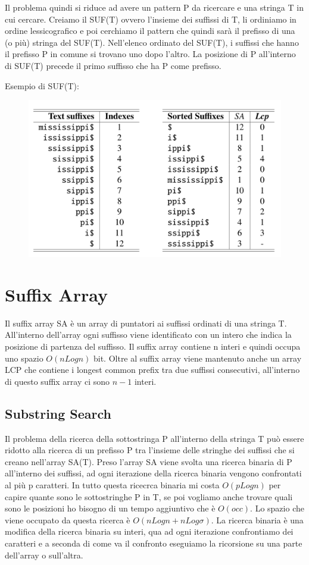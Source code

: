 \documentclass[14pt]{extreport}
\begin{document}
Il problema quindi si riduce ad avere un pattern P da ricercare e una stringa T in cui cercare. Creiamo il SUF(T) ovvero l'insieme dei suffissi di T, li ordiniamo in ordine lessicografico e poi cerchiamo il pattern che quindi sarà il prefisso di una (o più) stringa del SUF(T).
Nell'elenco ordinato del SUF(T), i suffissi che hanno il prefisso P in comune si trovano uno dopo l'altro.
La posizione di P all'interno di SUF(T) precede il primo suffisso che ha P come prefisso.

Esempio di SUF(T):

\begin{figure}[!h]
\centering
  \includegraphics[width=0.7\linewidth]{SUFT.png}
\end{figure}

\section{Suffix Array}

Il suffix array SA è un array di puntatori ai suffissi ordinati di una stringa T. All'interno dell'array ogni suffisso viene identificato con un intero che indica la posizione di partenza del suffisso.
Il suffix array contiene n interi e quindi occupa uno spazio $O(nLogn)$ bit. 
Oltre al suffix array viene mantenuto anche un array LCP che contiene i longest common prefix tra due suffissi consecutivi, all'interno di questo suffix array ci sono $n-1$ interi.

\subsection{Substring Search}

Il problema della ricerca della sottostringa P all'interno della stringa T può essere ridotto alla ricerca di un prefisso P tra l'insieme delle stringhe dei suffissi che si creano nell'array SA(T).
Preso l'array SA viene svolta una ricerca binaria di P all'interno dei suffissi, ad ogni iterazione della ricerca binaria vengono confrontati al più p caratteri. In tutto questa ricecrca binaria mi costa $O(pLogn)$ per capire quante sono le sottostringhe P in T, se poi vogliamo anche trovare quali sono le posizioni ho bisogno di un tempo aggiuntivo che è $O(occ)$. Lo spazio che viene occupato da questa ricerca è $O(nLogn + nLog\sigma)$.
La ricerca binaria è una modifica della ricerca binaria su interi, qua ad ogni iterazione confrontiamo dei caratteri e a seconda di come va il confronto eseguiamo la ricorsione su una parte dell'array o sull'altra.
\end{document}
